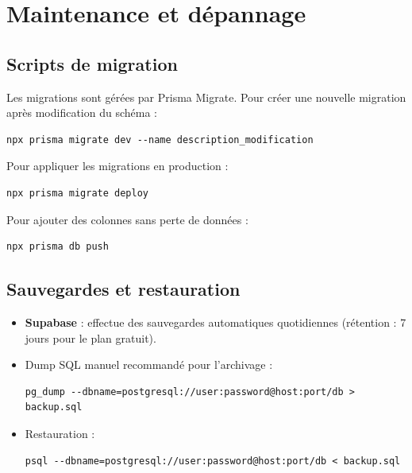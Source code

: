 \documentclass[12pt,a4paper]{report}
\begin{document}
\chapter{Maintenance et dépannage}
 
\section{Scripts de migration}
Les migrations sont gérées par Prisma Migrate. Pour créer une nouvelle migration après modification du schéma :
\begin{lstlisting}
npx prisma migrate dev --name description_modification
\end{lstlisting}
Pour appliquer les migrations en production :
\begin{lstlisting}
npx prisma migrate deploy
\end{lstlisting}
 
Pour ajouter des colonnes sans perte de données :
\begin{lstlisting}
npx prisma db push
\end{lstlisting}
 
\section{Sauvegardes et restauration}
\begin{itemize}[leftmargin=*]
    \item \textbf{Supabase} : effectue des sauvegardes automatiques quotidiennes (rétention : 7 jours pour le plan gratuit).
    \item Dump SQL manuel recommandé pour l'archivage :
\begin{lstlisting}
pg_dump --dbname=postgresql://user:password@host:port/db > backup.sql
\end{lstlisting}
    \item Restauration :
\begin{lstlisting}
psql --dbname=postgresql://user:password@host:port/db < backup.sql
\end{lstlisting}
\end{itemize}
 
\end{document}
